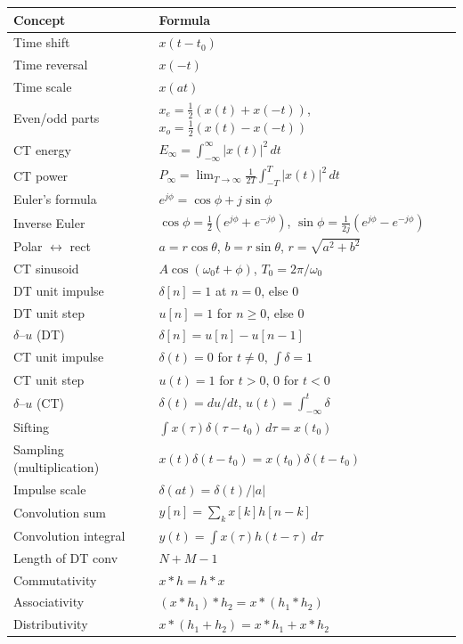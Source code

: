 \documentclass[11pt]{article}
\begin{document}
\begin{center}
\renewcommand{\arraystretch}{1.2}
\begin{tabular}{|l|l|}
\hline
\textbf{Concept} & \textbf{Formula} \\
\hline
Time shift & $x(t-t_0)$ \\
Time reversal & $x(-t)$ \\
Time scale & $x(at)$ \\
Even/odd parts & $x_e=\tfrac{1}{2}(x(t)+x(-t))$, $x_o=\tfrac{1}{2}(x(t)-x(-t))$ \\
CT energy & $E_\infty = \int_{-\infty}^{\infty}|x(t)|^2\,dt$ \\
CT power & $P_\infty = \lim_{T\to\infty}\tfrac{1}{2T}\int_{-T}^{T}|x(t)|^2\,dt$ \\
Euler's formula & $e^{j\phi} = \cos\phi + j\sin\phi$ \\
Inverse Euler & $\cos\phi = \tfrac{1}{2}(e^{j\phi}+e^{-j\phi})$, $\sin\phi = \tfrac{1}{2j}(e^{j\phi}-e^{-j\phi})$ \\
Polar $\leftrightarrow$ rect & $a=r\cos\theta$, $b=r\sin\theta$, $r=\sqrt{a^2+b^2}$ \\
CT sinusoid & $A\cos(\omega_0 t+\phi)$, $T_0 = 2\pi/\omega_0$ \\
DT unit impulse & $\delta[n]=1$ at $n=0$, else $0$ \\
DT unit step & $u[n]=1$ for $n\geq 0$, else $0$ \\
$\delta$--$u$ (DT) & $\delta[n]=u[n]-u[n-1]$ \\
CT unit impulse & $\delta(t)=0$ for $t\neq 0$, $\int\delta = 1$ \\
CT unit step & $u(t)=1$ for $t>0$, $0$ for $t<0$ \\
$\delta$--$u$ (CT) & $\delta(t)=du/dt$, $u(t)=\int_{-\infty}^{t}\delta$ \\
Sifting & $\int x(\tau)\delta(\tau-t_0)\,d\tau = x(t_0)$ \\
Sampling (multiplication) & $x(t)\delta(t-t_0) = x(t_0)\delta(t-t_0)$ \\
Impulse scale & $\delta(at) = \delta(t)/|a|$ \\
Convolution sum & $y[n] = \sum_k x[k]h[n-k]$ \\
Convolution integral & $y(t) = \int x(\tau)h(t-\tau)\,d\tau$ \\
Length of DT conv & $N + M - 1$ \\
Commutativity & $x*h = h*x$ \\
Associativity & $(x*h_1)*h_2 = x*(h_1*h_2)$ \\
Distributivity & $x*(h_1+h_2) = x*h_1 + x*h_2$ \\

\end{tabular}
\end{center}
\end{document}
